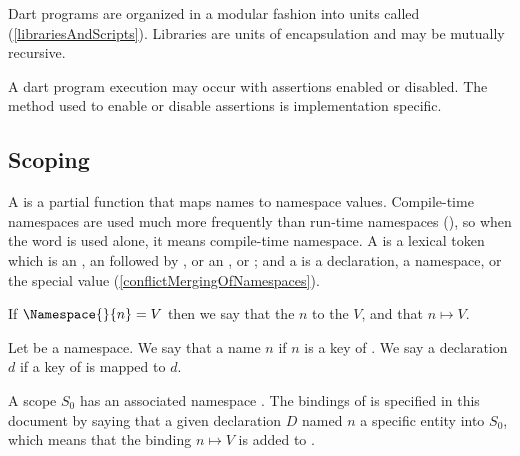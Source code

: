 \documentclass[makeidx]{article}
\begin{document}
\LMHash{}%
Dart programs are organized in a modular fashion into
units called  (\ref{librariesAndScripts}).
Libraries are units of encapsulation and may be mutually recursive.


\LMHash{}%
A dart program execution may occur with assertions enabled or disabled.
The method used to enable or disable assertions is implementation specific.


\subsection{Scoping}

\LMHash{}%
A 
is a partial function that maps names to namespace values.
Compile-time namespaces are used much more frequently than run-time namespaces
(),
so when the word  is used alone,
it means compile-time namespace.
A  is a lexical token which is an ,
an  followed by \lit{=}, or
an ,
or ;
and a  is
a declaration, a namespace, or the special value \ConflictValue{}
(\ref{conflictMergingOfNamespaces}).

\LMHash{}%
If $\Namespace{}{n} = V$ then we say that \NamespaceName{}
the
$n$ to the
$V$,
and that \NamespaceName{}
$n\mapsto{}V$.

\LMHash{}%
Let \NamespaceName{} be a namespace.
We say that a name $n$  \NamespaceName{}
if $n$ is a key of \NamespaceName.
We say a declaration $d$  \NamespaceName{}
if a key of \NamespaceName{} is mapped to $d$.

\LMHash{}%
A scope $S_0$ has an associated namespace .
The bindings of  is specified in this document by saying that
a given declaration $D$ named $n$
a specific entity  into $S_0$,
which means that the binding $n\mapsto{}V$ is added to .
\end{document}
